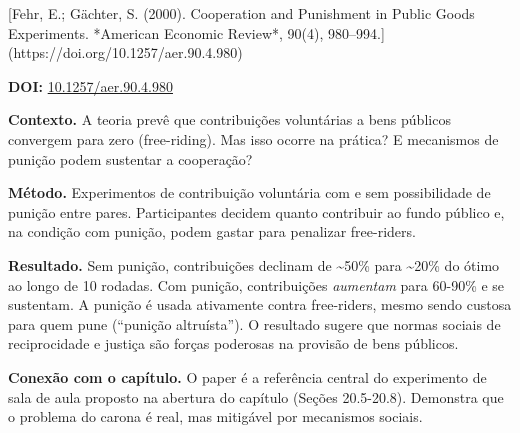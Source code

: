 \documentclass[11pt,twoside,openright]{book}
\begin{document}
\begin{pesquisabox}{[Fehr, E.; Gächter, S. (2000). Cooperation and Punishment in Public Goods Experiments. *American Economic Review*, 90(4), 980–994.](https://doi.org/10.1257/aer.90.4.980)}

\textbf{DOI:}
\href{https://doi.org/10.1257/aer.90.4.980}{10.1257/aer.90.4.980}

\textbf{Contexto.} A teoria prevê que contribuições voluntárias a bens
públicos convergem para zero (free-riding). Mas isso ocorre na prática?
E mecanismos de punição podem sustentar a cooperação?

\textbf{Método.} Experimentos de contribuição voluntária com e sem
possibilidade de punição entre pares. Participantes decidem quanto
contribuir ao fundo público e, na condição com punição, podem gastar
para penalizar free-riders.

\textbf{Resultado.} Sem punição, contribuições declinam de
\textasciitilde50\% para \textasciitilde20\% do ótimo ao longo de 10
rodadas. Com punição, contribuições \emph{aumentam} para 60-90\% e se
sustentam. A punição é usada ativamente contra free-riders, mesmo sendo
custosa para quem pune (``punição altruísta''). O resultado sugere que
normas sociais de reciprocidade e justiça são forças poderosas na
provisão de bens públicos.

\textbf{Conexão com o capítulo.} O paper é a referência central do
experimento de sala de aula proposto na abertura do capítulo (Seções
20.5-20.8). Demonstra que o problema do carona é real, mas mitigável por
mecanismos sociais.

\end{pesquisabox}
\end{document}
